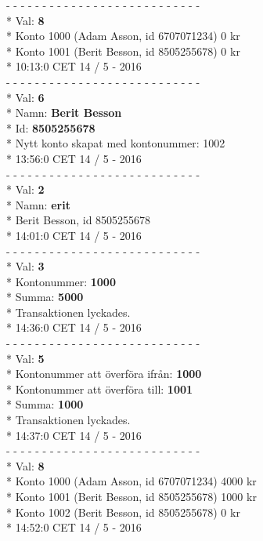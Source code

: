 \begin{multicols}{2}
- - - - - - - - - - - - - - - - - - - - - - - - - - -\\*
Val: \textbf{8}\\*
Konto 1000 (Adam Asson, id 6707071234) 0 kr\\*
Konto 1001 (Berit Besson, id 8505255678) 0 kr\\*
10:13:0 CET 14 / 5 - 2016\\
- - - - - - - - - - - - - - - - - - - - - - - - - - -\\*
Val: \textbf{6}\\*
Namn: \textbf{Berit Besson}\\*
Id: \textbf{8505255678}\\*
Nytt konto skapat med kontonummer: 1002\\*
13:56:0 CET 14 / 5 - 2016\\
- - - - - - - - - - - - - - - - - - - - - - - - - - -\\*
Val: \textbf{2}\\*
Namn: \textbf{erit}\\*
Berit Besson, id 8505255678\\*
14:01:0 CET 14 / 5 - 2016\\
- - - - - - - - - - - - - - - - - - - - - - - - - - -\\*
Val: \textbf{3}\\*
Kontonummer: \textbf{1000}\\*
Summa: \textbf{5000}\\*
Transaktionen lyckades.\\*
14:36:0 CET 14 / 5 - 2016\\
- - - - - - - - - - - - - - - - - - - - - - - - - - -\\*
Val: \textbf{5}\\*
Kontonummer att överföra ifrån: \textbf{1000}\\*
Kontonummer att överföra till: \textbf{1001}\\*
Summa: \textbf{1000}\\*
Transaktionen lyckades.\\*
14:37:0 CET 14 / 5 - 2016\\
- - - - - - - - - - - - - - - - - - - - - - - - - - -\\*
Val: \textbf{8}\\*
Konto 1000 (Adam Asson, id 6707071234) 4000 kr\\*
Konto 1001 (Berit Besson, id 8505255678) 1000 kr\\*
Konto 1002 (Berit Besson, id 8505255678) 0 kr\\*
14:52:0 CET 14 / 5 - 2016\\

\end{multicols}
